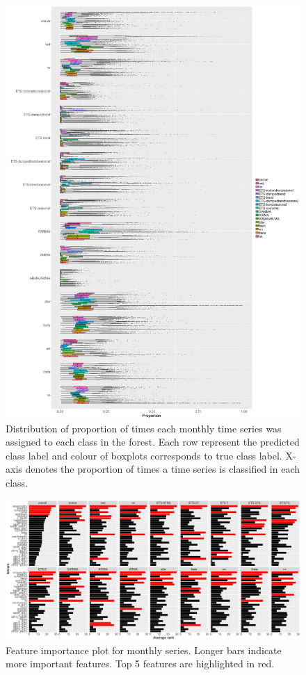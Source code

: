 \documentclass[11pt,a4paper,]{article}
\theoremstyle{definition}
\theoremstyle{definition}
\theoremstyle{definition}
\theoremstyle{remark}
\begin{document}
\begin{figure}
\centering
\includegraphics{figures/oobmonthly-1.png}
\caption{\label{fig:oobmonthly}Distribution of proportion of times each
monthly time series was assigned to each class in the forest. Each row
represent the predicted class label and colour of boxplots corresponds
to true class label. X-axis denotes the proportion of times a time
series is classified in each class.}
\end{figure}

\newpage

\begin{figure}[h]

{\centering \includegraphics{figures/vimonthly-1} 

}

\caption{Feature importance plot for monthly series. Longer bars indicate more important features. Top 5 features are highlighted in red.}\label{fig:vimonthly}
\end{figure}
\end{document}
